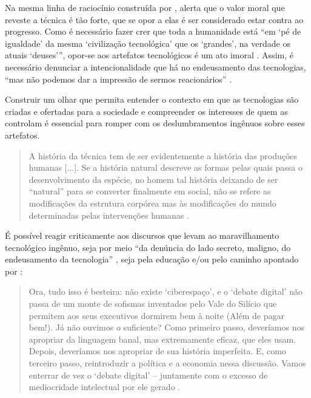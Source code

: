 \documentclass[portuguese]{textolivre}
\begin{document}
Na mesma linha de raciocínio construída por \textcite{morozov2018}, \textcite{pinto_o_2005} alerta que o valor moral que reveste a técnica é tão forte, que se opor a elas é ser considerado estar contra ao progresso. Como é necessário fazer crer que toda a humanidade está “em ‘pé de igualdade’ da mesma ‘civilização tecnológica’ que os ‘grandes’, na verdade os atuais ‘deuses’”, opor-se aos artefatos tecnológicos é um ato imoral \cite[p.43]{pinto_o_2005}. Assim, é necessário denunciar a intencionalidade que há no endeusamento das tecnologias, “mas não podemos dar a impressão de sermos reacionários” \cite[p. 44]{pinto_o_2005}.

Construir um olhar que permita entender o contexto em que as tecnologias são criadas e ofertadas para a sociedade e compreender os interesses de quem as controlam é essencial para romper com os deslumbramentos ingênuos sobre esses artefatos.

\begin{quote}
 A história da técnica tem de ser evidentemente a história das produções humanas [...]. Se a história natural descreve as formas pelas quais passa o desenvolvimento da espécie, no homem tal história deixando de ser “natural” para se converter finalmente em social, não se refere as modificações da estrutura corpórea mas às modificações do mundo determinadas pelas intervenções humanas \cite[p. 64]{pinto_o_2005}.
\end{quote}

É possível reagir criticamente aos discursos que levam ao maravilhamento tecnológico ingênuo, seja por meio “da denúncia do lado secreto, maligno, do endeusamento da tecnologia” \cite[p. 44]{pinto_o_2005}, seja pela educação \cite{freire_educar_2011} e/ou pelo caminho apontado por \cite{morozov2018}:

\begin{quote}
 Ora, tudo isso é besteira: não existe ‘ciberespaço’, e o ‘debate digital’ não passa de um monte de sofismas inventados pelo Vale do Silício que permitem aos seus executivos dormirem bem à noite (Além de pagar bem!). Já não ouvimos o suficiente? Como primeiro passo, deveríamos nos apropriar da linguagem banal, mas extremamente eficaz, que eles usam. Depois, deveríamos nos apropriar de sua história imperfeita. E, como terceiro passo, reintroduzir a política e a economia nessa discussão. Vamos enterrar de vez o ‘debate digital’ – juntamente com o excesso de mediocridade intelectual por ele gerado \cite[p. 42]{morozov2018}.
\end{quote}
\end{document}
